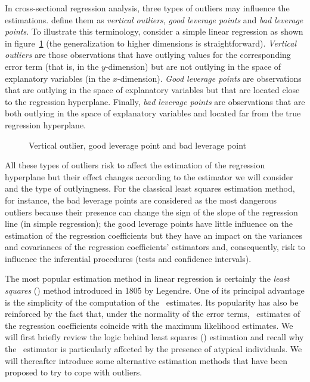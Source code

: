 In cross-sectional regression analysis, three types of outliers may influence
the estimations. \citet{rousseeuw:leroy:1987} define them as \emph{vertical
outliers}, \emph{good leverage points} and \emph{bad leverage points}. To
illustrate this terminology, consider a simple linear regression as shown in
figure~\ref{fig:outlier_types} (the generalization to higher dimensions is
straightforward). \emph{Vertical outliers} are those observations that have
outlying values for the corresponding error term (that is, in the
$y$-dimension) but are not outlying in the space of explanatory variables (in
the $x$-dimension). \emph{Good leverage points} are observations that are
outlying in the space of explanatory variables but that are located close to
the regression hyperplane. Finally, \emph{bad leverage points} are observations
that are both outlying in the space of explanatory variables and located far
from the true regression hyperplane.


\begin{figure}[h!]
    \centering
    \caption{Vertical outlier, good leverage point and bad leverage point}
    \label{fig:outlier_types}
\end{figure}

All these types of outliers risk to affect the estimation of the regression
hyperplane but their effect changes according to the estimator we will
consider and the type of outlyingness. For the classical least squares
estimation method, for instance, the bad leverage points are considered as the
most dangerous outliers because their presence can change the sign of the
slope of the regression line (in simple regression); the good leverage points
have little influence on the estimation of the regression coefficients but
they have an impact on the variances and covariances of the regression
coefficients' estimators and, consequently, risk to influence the inferential
procedures (tests and confidence intervals).

The most popular estimation method in linear regression is certainly the
\emph{least squares} () method introduced in 1805 by Legendre.          
One of its principal advantage is the simplicity of the
computation of the ~estimates. Its popularity has also be reinforced
by the fact that, under the normality of the error terms, ~estimates
of the regression coefficients coincide with the maximum likelihood estimates.
We will first briefly review the logic behind least squares ()
estimation and recall why the ~estimator is particularly affected by
the presence of atypical individuals. We will thereafter introduce some
alternative estimation methods that have been proposed to try to cope with
outliers.


